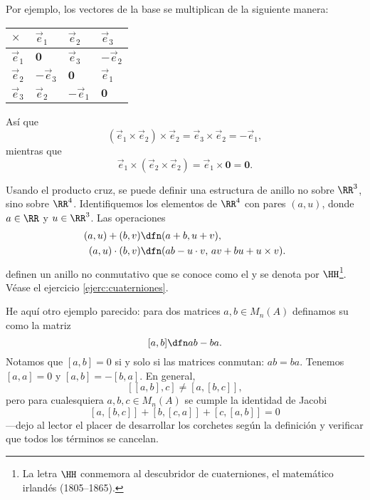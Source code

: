 \begin{ejemplo}
\begin{itemize}
    \ifwordy
    \begin{shaded}
      Por ejemplo, los vectores de la base se multiplican de la siguiente
      manera:

      \begin{center}
        \begin{tabular}{x{1cm}|x{1cm}x{1cm}x{1cm}}
          $\times$ & $\vec{e}_1$ & $\vec{e}_2$ & $\vec{e}_3$ \tabularnewline
          \hline
          $\vec{e}_1$ & $\mathbf{0}$ & $\vec{e}_3$ & $-\vec{e}_2$ \tabularnewline
          $\vec{e}_2$ & $-\vec{e}_3$ & $\mathbf{0}$ & $\vec{e}_1$ \tabularnewline
          $\vec{e}_3$ & $\vec{e}_2$ & $-\vec{e}_1$ & $\mathbf{0}$ \tabularnewline
        \end{tabular}
      \end{center}
      Así que
      $$(\vec{e}_1 \times \vec{e}_2)\times \vec{e}_2 = \vec{e}_3\times \vec{e}_2 = -\vec{e}_1,$$
      mientras que
      $$\vec{e}_1 \times (\vec{e}_2\times \vec{e}_2) = \vec{e}_1\times \mathbf{0} = \mathbf{0}.$$
    \end{shaded}
    \fi
  \end{itemize}

  Usando el producto cruz, se puede definir una estructura de anillo no sobre
  $\RR^3$, sino sobre $\RR^4$. Identifiquemos los elementos de $\RR^4$ con pares
  $(a,u)$, donde $a \in \RR$ y $u \in \RR^3$. Las operaciones
  \begin{align*}
    (a,u) + (b,v) & \dfn (a+b, u+v),\\
    (a,u) \cdot (b,v) & \dfn (ab - u\cdot v, \, av + bu + u\times v).
  \end{align*}
  definen un anillo no conmutativo que se conoce como el
   y se denota por $\HH$\footnote{La letra $\HH$
    conmemora al descubridor de cuaterniones, el matemático irlandés
     (1805--1865).}. Véase el ejercicio
  \ref{ejerc:cuaterniones}.
\end{ejemplo}

\begin{ejemplo}
  He aquí otro ejemplo parecido: para dos matrices $a,b \in M_n (A)$ definamos
  su  como la matriz
  \begin{equation}
    \label{eqn:conmutador-de-matrices}
    [a,b] \dfn ab - ba.
  \end{equation}
  Notamos que $[a,b] = 0$ si y solo si las matrices conmutan: $ab = ba$. Tenemos
  $[a,a] = 0$ y $[a,b] = - [b,a]$. En general,
  $$[[a,b],c] \ne [a,[b,c]],$$
  pero para cualesquiera $a,b,c\in M_n (A)$ se cumple la identidad de Jacobi
  $$[a,[b,c]] + [b,[c,a]] + [c,[a,b]] = 0$$
  ---dejo al lector el placer de desarrollar los corchetes según la definición
   y verificar que todos los términos se
  cancelan.
\end{ejemplo}

